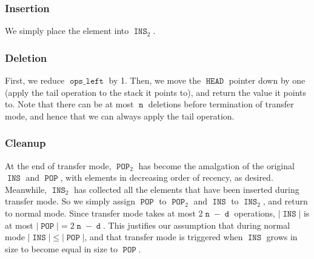 \documentclass[12.5pt]{scrartcl}
\DeclareMathOperator{\INS}{\mathtt{INS}}
\DeclareMathOperator{\POP}{\mathtt{POP}}
\DeclareMathOperator{\HEAD}{\mathtt{HEAD}}
\DeclareMathOperator{\opsleft}{\mathtt{ops\_left}}
\DeclareMathOperator{\n}{\mathtt{n}}
\DeclareMathOperator{\dd}{\mathtt{d}}
\begin{document}
\subsubsection{Insertion} We simply place the element into $\INS_2$.

\subsubsection{Deletion} First, we reduce $\opsleft$ by 1. Then, we move the $\HEAD$ pointer down by one (apply the tail operation to the stack it points to), and return the value it points to. Note that there can be at most $\n$ deletions before termination of transfer mode, and hence that we can always apply the tail operation.

\subsubsection{Cleanup} At the end of transfer mode, $\POP_2$ has become the amalgation of the original $\INS$ and $\POP$, with elements in decreasing order of recency, as desired. Meanwhile, $\INS_2$ has collected all the elements that have been inserted during transfer mode. So we simply assign $\POP$ to $\POP_2$ and $\INS$ to $\INS_2$, and return to normal mode. Since transfer mode takes at most $2\n - \dd$ operations, $|\INS|$ is at most $|\POP| = 2\n - \dd$. This justifies our assumption that during normal mode $|\INS| \leq |\POP|$, and that transfer mode is triggered when $\INS$ grows in size to become equal in size to $\POP$. 

\nocite{hood}

\printbibliography
\end{document}
